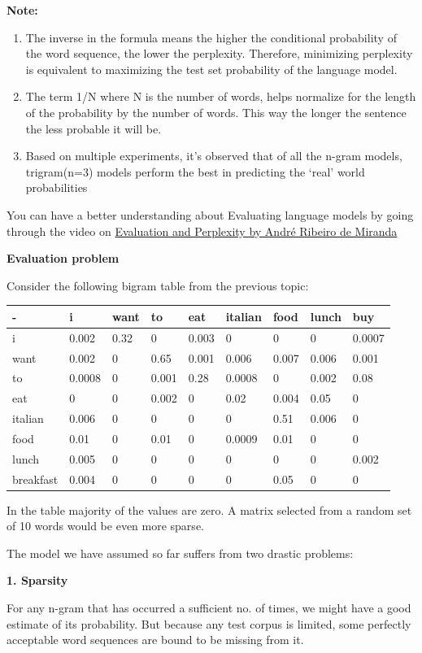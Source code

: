 \documentclass[11pt]{article}
\begin{document}
\textbf{Note:}

\begin{enumerate}
\def\labelenumi{\arabic{enumi}.}
\item
  The inverse in the formula means the higher the conditional
  probability of the word sequence, the lower the perplexity. Therefore,
  minimizing perplexity is equivalent to maximizing the test set
  probability of the language model.
\item
  The term 1/N where N is the number of words, helps normalize for the
  length of the probability by the number of words. This way the longer
  the sentence the less probable it will be.
\item
  Based on multiple experiments, it's observed that of all the n-gram
  models, trigram(n=3) models perform the best in predicting the `real'
  world probabilities
\end{enumerate}

You can have a better understanding about Evaluating language models by
going through the video on
\href{https://www.youtube.com/watch?v=BAN3NB_SNHY}{Evaluation and
Perplexity by André Ribeiro de Miranda}

\textbf{Evaluation problem}

Consider the following bigram table from the previous topic:

\begin{longtable}[]{@{}lllllllll@{}}
\toprule
- & i & want & to & eat & italian & food & lunch & buy\tabularnewline
\midrule
\endhead
i & 0.002 & 0.32 & 0 & 0.003 & 0 & 0 & 0 & 0.0007\tabularnewline
want & 0.002 & 0 & 0.65 & 0.001 & 0.006 & 0.007 & 0.006 &
0.001\tabularnewline
to & 0.0008 & 0 & 0.001 & 0.28 & 0.0008 & 0 & 0.002 &
0.08\tabularnewline
eat & 0 & 0 & 0.002 & 0 & 0.02 & 0.004 & 0.05 & 0\tabularnewline
italian & 0.006 & 0 & 0 & 0 & 0 & 0.51 & 0.006 & 0\tabularnewline
food & 0.01 & 0 & 0.01 & 0 & 0.0009 & 0.01 & 0 & 0\tabularnewline
lunch & 0.005 & 0 & 0 & 0 & 0 & 0 & 0 & 0.002\tabularnewline
breakfast & 0.004 & 0 & 0 & 0 & 0 & 0.05 & 0 & 0\tabularnewline
\bottomrule
\end{longtable}

In the table majority of the values are zero. A matrix selected from a
random set of 10 words would be even more sparse.

The model we have assumed so far suffers from two drastic problems:

\textbf{1. Sparsity}

For any n-gram that has occurred a sufficient no. of times, we might
have a good estimate of its probability. But because any test corpus is
limited, some perfectly acceptable word sequences are bound to be
missing from it.
\end{document}
